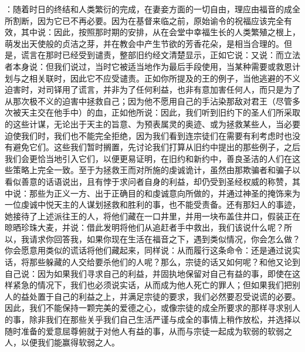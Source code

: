 ：随着时日的终结和人类繁衍的完成，在妻妾方面的一切自由，理应由福音的成全所割断，因为它已不再必要。因为在基督来临之前，原始谕令的祝福应该完全有效，其中说：因此，按照那时期的安排，从在会堂中幸福生长的人类繁殖之根上，萌发出天使般的贞洁之芽，并在教会中产生节欲的芳香花朵，是相当合理的。但是，谎言在那时已经受到谴责，整部旧约经文清楚显示，正如它说：又说：而立法者本身说：但我们说过，当时它被适当地作为最后手段使用，当某种需要或救恩计划与之相关联时，因此它不应受谴责。正如你所提及的王的例子，当他逃避的不义迫害时，对司铎用了谎言，并非为了任何利益，也非有意加害任何人，而只是为了从那次极不义的迫害中拯救自己；因为他不愿用自己的手沾染那敌对君王（尽管多次被天主交在他手中）的血，正如他所说：因此，我们听到旧约下的圣人们所采取的这些计谋，无论出于天主的旨意、为预表属灵的奥迹、或为拯救某些人，当必要迫使我们时，我们也不能完全拒绝，因为我们看到连宗徒们在需要有利考虑时也没有避免它们。这些我们暂时搁置，先讨论我们打算从旧约中提出的那些例子，之后我们会更恰当地引入它们，以便更易证明，在旧约和新约中，善良圣洁的人们在这些策略上完全一致。至于为拯救王而对所施的虔诚诡计，虽然由那欺骗者和骗子以看似善意的话语说出，且有悖于求问者自身的利益，却仍受到圣经权威的称赞，其中说：那些为正义一方、出于正确目的和虔诚意向所做的，并通过神圣的掩饰来为一位虔诚中悦天主的人谋划拯救和胜利的事，也不能受责备。还有那妇人的事迹，她接待了上述派往王的人，将他们藏在一口井里，并用一块布盖住井口，假装正在晾晒珍珠大麦，并说：借此发明将他们从追赶者手中救出，我们该说什么呢？所以，我请求你回答我，如果你现在生活在福音之下，遇到类似情况，你会怎么做？你会愿意用类似的谎话将他们藏起来，同样说：从而履行这条命令：还是通过说实话，将那些躲藏的人交给要杀他们的人呢？那么，宗徒的话又如何呢？和他又论到自己说：因为如果我们寻求自己的利益，并固执地保留对自己有益的事，即使在这样紧急的情况下，我们也必须说实话，从而成为他人死亡的罪人；但如果我们把别人的益处置于自己的利益之上，并满足宗徒的要求，我们必然要忍受说谎的必要。因此，我们不能保持一颗完美的爱德之心，或像宗徒的成全所要求的那样寻求别人的事，除非我们在那些关乎我们自己生活严谨与成全的事情上稍作放松，并选择以随时准备的爱意屈尊俯就于对他人有益的事，从而与宗徒一起成为软弱的软弱之人，以便我们能赢得软弱之人。\par

